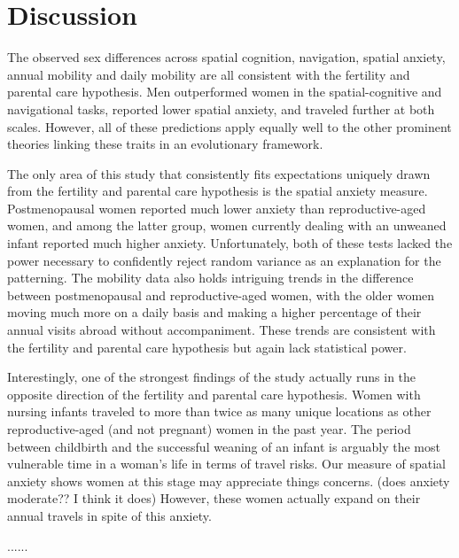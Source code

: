 \section{Discussion}
\label{sec:4}

The observed sex differences across spatial cognition, navigation, spatial anxiety, annual mobility and daily mobility are all consistent with the fertility and parental care hypothesis.  Men outperformed women in the spatial-cognitive and navigational tasks, reported lower spatial anxiety, and traveled further at both scales.  However, all of these predictions apply equally well to the other prominent theories linking these traits in an evolutionary framework.  

The only area of this study that consistently fits expectations uniquely drawn from the fertility and parental care hypothesis is the spatial anxiety measure.  Postmenopausal women reported much lower anxiety than reproductive-aged women, and among the latter group, women currently dealing with an unweaned infant reported much higher anxiety.  Unfortunately, both of these tests lacked the power necessary to confidently reject random variance as an explanation for the patterning.  The mobility data also holds intriguing trends in the difference between postmenopausal and reproductive-aged women, with the older women moving much more on a daily basis and making a higher percentage of their annual visits abroad without accompaniment.  These trends are consistent with the fertility and parental care hypothesis but again lack statistical power.

Interestingly, one of the strongest findings of the study actually runs in the opposite direction of the fertility and parental care hypothesis.  Women with nursing infants traveled to more than twice as many unique locations as other reproductive-aged (and not pregnant) women in the past year.  The period between childbirth and the successful weaning of an infant is arguably the most vulnerable time in a woman's life in terms of travel risks.  Our measure of spatial anxiety shows women at this stage may appreciate things concerns. (does anxiety moderate??  I think it does)  However, these women actually expand on their annual travels in spite of this anxiety. 

......




